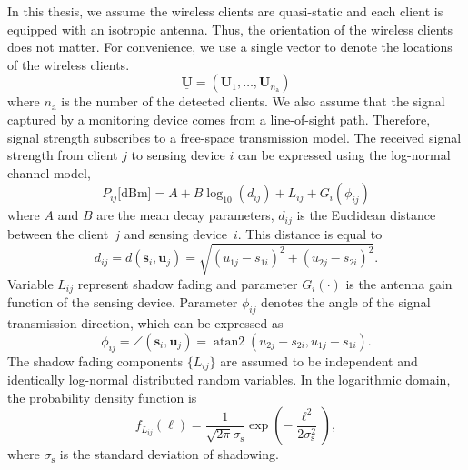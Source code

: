 In this thesis, we assume the wireless clients are quasi-static and each client is equipped with an isotropic antenna.
Thus, the orientation of the wireless clients does not matter.
For convenience, we use a single vector to denote the locations of the wireless clients.
\begin{equation}
\underline{\mathbf{U}} = (\mathbf{U}_1, \ldots, \mathbf{U}_{n_{\mathrm{a}}})
\end{equation}
where $n_{\mathrm{a}}$ is the number of the detected clients.
We also assume that the signal captured by a monitoring device comes from a line-of-sight path.
Therefore, signal strength subscribes to a free-space transmission model.
The received signal strength from client $j$ to sensing device $i$ can be expressed using the log-normal channel model,
\begin{equation} 
P_{ij} \text{[dBm]}
= A + B \log_{10}(d_{ij}) + L_{ij} + G_i (\phi_{ij})
\end{equation}
where $A$ and $B$ are the mean decay parameters, $d_{ij}$ is the Euclidean distance between the client~$j$ and sensing device~$i$.
This distance is equal to
\begin{equation*}
d_{ij} = d(\mathbf{s}_i, \mathbf{u}_j)
= \sqrt{ (u_{1j} - s_{1i})^2 + (u_{2j} - s_{2i})^2 } .
\end{equation*}
Variable $L_{ij}$ represent shadow fading and parameter $G_i (\cdot)$ is the antenna gain function of the sensing device.
Parameter $\phi_{ij}$ denotes the angle of the signal transmission direction, which can be expressed as
\begin{equation*}
\phi_{ij} = \angle (\mathbf{s}_i, \mathbf{u}_j)
= \operatorname{atan2} ( u_{2j} - s_{2i}, u_{1j} - s_{1i} ) .
\end{equation*}
The shadow fading components $\{ L_{ij} \}$ are assumed to be independent and identically log-normal distributed random variables.
In the logarithmic domain, the probability density function is
\begin{equation} 
f_{L_{ij}} (\ell)
= \frac{1}{\sqrt{2 \pi} \sigma_{\mathrm{s}}} 
\exp \left( - \frac{\ell^2}{2 \sigma_{\mathrm{s}}^2} \right) ,
\end{equation}
where $\sigma_{\mathrm{s}}$ is the standard deviation of shadowing.

